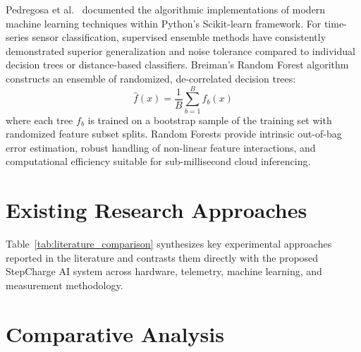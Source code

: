 Pedregosa et al.~\cite{pedregosa2011scikit} documented the algorithmic implementations of modern machine learning techniques within Python's Scikit-learn framework. For time-series sensor classification, supervised ensemble methods have consistently demonstrated superior generalization and noise tolerance compared to individual decision trees or distance-based classifiers. Breiman's Random Forest algorithm~\cite{breiman2001random} constructs an ensemble of randomized, de-correlated decision trees:
\begin{equation}
\hat{f}(x) = \frac{1}{B} \sum_{b=1}^B f_b(x)
\label{eq:random_forest}
\end{equation}
where each tree $f_b$ is trained on a bootstrap sample of the training set with randomized feature subset splits. Random Forests provide intrinsic out-of-bag error estimation, robust handling of non-linear feature interactions, and computational efficiency suitable for sub-millisecond cloud inferencing.

\section{Existing Research Approaches}
Table~\ref{tab:literature_comparison} synthesizes key experimental approaches reported in the literature and contrasts them directly with the proposed StepCharge AI system across hardware, telemetry, machine learning, and measurement methodology.

\section{Comparative Analysis}

